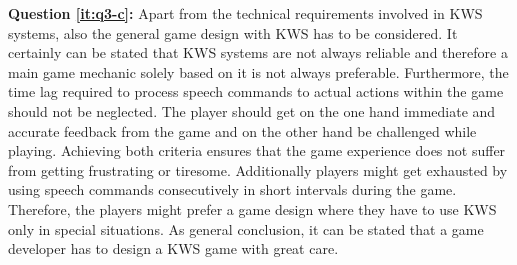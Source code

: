 \textbf{Question \ref{it:q3-c}:}
Apart from the technical requirements involved in KWS systems, also the general game design with KWS has to be considered.
It certainly can be stated that KWS systems are not always reliable and therefore a main game mechanic solely based on it is not always preferable.
Furthermore, the time lag required to process speech commands to actual actions within the game should not be neglected.
The player should get on the one hand immediate and accurate feedback from the game and on the other hand be challenged while playing.
Achieving both criteria ensures that the game experience does not suffer from getting frustrating or tiresome.
Additionally players might get exhausted by using speech commands consecutively in short intervals during the game.
Therefore, the players might prefer a game design where they have to use KWS only in special situations.
As general conclusion, it can be stated that a game developer has to design a KWS game with great care.